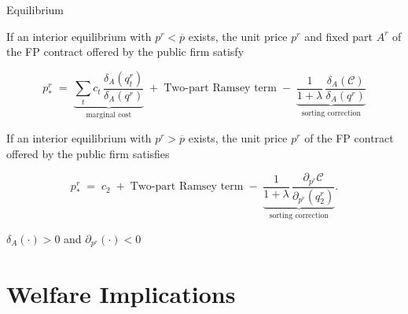\documentclass{class}
\begin{document}
\begin{frame}{Equilibrium}\label{RamseyOutside}


\begin{proposition}\label{prop:eqFPPublic}
If an interior equilibrium with $p^r<\overline{p}$ exists, the unit price $p^r$ and fixed part $A^r$ of the FP contract offered by the public firm satisfy

\vspace{0.25 cm}

\begin{equation*}
p^r_{\ast}
\;=\;
\underbrace{\sum_{t} c_t\,\frac{\delta_{A}(q_t^r)}{\delta_{A}(q^r)}}_{\text{marginal cost}} \; + \; \text{Two-part Ramsey term}
\;-\;
\underbrace{\frac{1}{1+\lambda}\,\frac{\delta_{A}(\mathcal{C})}{\delta_{A}(q^r)}}_{\text{sorting correction}}
\end{equation*}

\vspace{0.25 cm}

If an interior equilibrium with $p^r>\overline{p}$ exists, the unit price $p^r$ of the FP contract offered by the public firm satisfies

\vspace{0.25 cm}

\[
p^r_{\ast} \;=\; c_2  \; + \;
\text{Two-part Ramsey term}
\;-\;
\underbrace{\frac{1}{1+\lambda}\,\frac{\partial_{p^r}\mathcal{C}}{\partial_{p^r}(q^r_2)}}_{\text{sorting correction}}.
\]

\end{proposition}


  $\delta_{A}(\cdot)>0$ and $\partial_{p^r}(\cdot)<0 \qquad $    \hyperlink{Ramseytax}{}



\end{frame}




\section{Welfare Implications}

\end{document}
